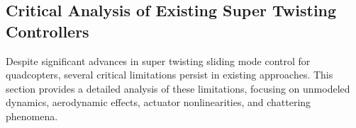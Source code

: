 

\subsection{Critical Analysis of Existing Super Twisting Controllers}

Despite significant advances in super twisting sliding mode control for quadcopters, several critical limitations persist in existing approaches. This section provides a detailed analysis of these limitations, focusing on unmodeled dynamics, aerodynamic effects, actuator nonlinearities, and chattering phenomena.


